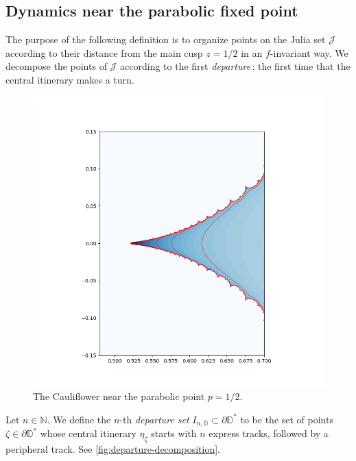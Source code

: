 \subsection{Dynamics near the parabolic fixed point}

The purpose of the following definition is to organize points on the Julia set $\mathcal J$ according to their distance from the main cusp $z=1/2$ in an $f$-invariant way. We decompose the points of $\mathcal J$ according to the first \emph{departure}\,: the first time that the central itinerary makes a turn.

\begin{figure}
    \centering
    \includegraphics[width=\textwidth]{figures/cauliflower_equipotentials2.png}
    \caption{The Cauliflower near the parabolic point $p=1/2$.}
    \label{fig:my_figure}
\end{figure}

\begin{definition}

Let $n \in \mathbb N$. We define the $n$-th \emph{departure set} $I_{n, \mathbb D} \subset \partial \mathbb D ^*$ to be the set of points $\zeta \in \partial \mathbb D^*$ whose central itinerary $\eta_{\zeta}$ starts with $n$ express tracks, followed by a peripheral track.
See \cref{fig:departure-decomposition}.
\end{definition}

